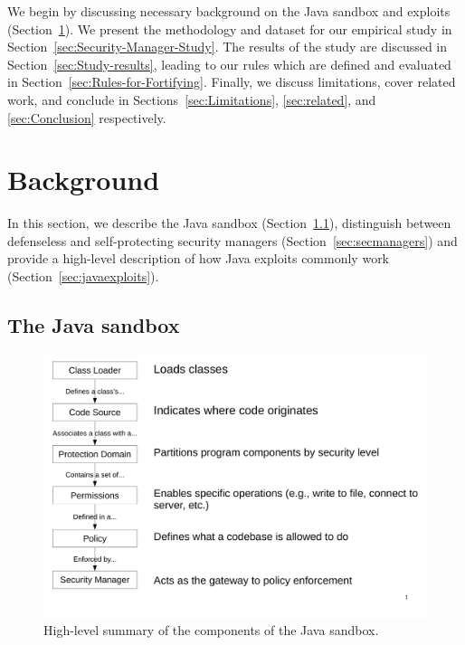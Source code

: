 \documentclass{sig-alternate}
\begin{document}
We begin by discussing necessary background on the Java sandbox and exploits
(Section~\ref{sec:Background}).  We present the methodology and  
dataset for our empirical study in Section~\ref{sec:Security-Manager-Study}. The
results of the study are discussed in  
Section~\ref{sec:Study-results}, leading to our rules which are defined and evaluated in 
Section~\ref{sec:Rules-for-Fortifying}. Finally, we discuss limitations, cover 
related work, and conclude in Sections~\ref{sec:Limitations}, \ref{sec:related}, and 
\ref{sec:Conclusion} respectively.

\section{Background}\label{sec:Background}

In this section, we describe the Java sandbox
(Section~\ref{sec:sandbox}), distinguish between defenseless and self-protecting
security managers (Section~\ref{sec:secmanagers}) and provide a high-level
description of how Java exploits commonly work
(Section~\ref{sec:javaexploits}). 

\subsection{The Java sandbox}
\label{sec:sandbox}

\begin{figure}
\includegraphics[width=\columnwidth]{sandbox_overview}
\caption{High-level summary of the components of the Java 
\label{fig:Sandbox-high-level-summary}
sandbox.}
\end{figure}
\end{document}
